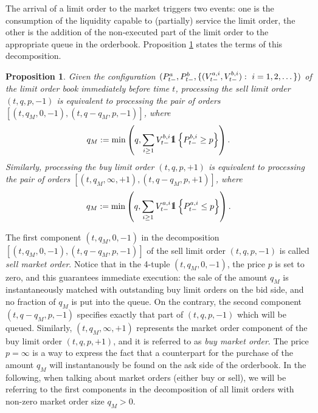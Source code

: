 \documentclass[10pt]{article}
\newtheorem{prop}[thm]{Proposition}
\begin{document}
The arrival of a limit order to the market triggers two events: one is the consumption of the liquidity capable to (partially) service the limit order, the other is the addition of the non-executed part of the limit order to the appropriate queue in the orderbook. Proposition \ref{prop.decomposition_of_limit_order} states the terms of this decomposition.

\begin{prop}\label{prop.decomposition_of_limit_order}
 Given the configuration $(\bestAskPrice_{t-}, \bestBidPrice_{t-},\lbrace  (\nthBestAskVolume[i]_{t-}, \nthBestBidVolume[i]_{t-}) : \, \, i=1,2,\dots\rbrace )$ of the limit order book immediately before time $t$, processing the sell limit order $(t,q,p,-1)$ is equivalent to processing the pair of orders $[(t,q_M,0,-1),(t,q-q_M,p,-1) ]$, where 
 \begin{equation*}
  q_M:= \min\left(q, \sum_{i\geq 1} \nthBestBidVolume[i]_{t-} \one \left\lbrace \nthBestBidPrice[i]_{t-}\geq p\right\rbrace\right).
 \end{equation*}
Similarly, processing the buy limit order $(t,q,p,+1)$ is equivalent to processing the pair of orders $[(t,q_M,\infty,+1),(t,q-q_M,p,+1) ]$, where 
 \begin{equation*}
  q_M:= \min\left (q, \sum_{i\geq 1} \nthBestAskVolume[i]_{t-} \one \left\lbrace \nthBestAskPrice[i]_{t-}\leq  p\right\rbrace\right).
 \end{equation*}
\end{prop}

The first component $(t,q_M,0,-1)$ in the decomposition $[(t,q_M,0,-1),(t,q-q_M,p,-1) ]$ of the sell limit order $(t,q,p,-1)$ is called \emph{sell market order}. Notice that in the 4-tuple $(t,q_M,0,-1)$, the price $p$ is set to zero, and this guarantees immediate execution: the sale of the amount $q_M$ is instantaneously matched with outstanding buy limit orders on the bid side, and no fraction of $q_M$ is put into the queue. On the contrary, the second component $(t,q-q_M,p,-1)$ specifies exactly that part of $(t,q,p,-1)$ which will be queued. 
Similarly, $(t,q_M,\infty,+1)$ represents the market order component of the buy limit order $(t,q,p,+1)$, and it is referred to as \emph{buy market order}. The price $p=\infty$ is a way to express the fact that a counterpart for the purchase of the amount $q_M$ will instantanously be found on the ask side of the orderbook. In the following, when talking about market orders (either buy or sell), we will be referring to the first components  in the decomposition of all limit orders with non-zero market order size $q_M >0$.
\end{document}
